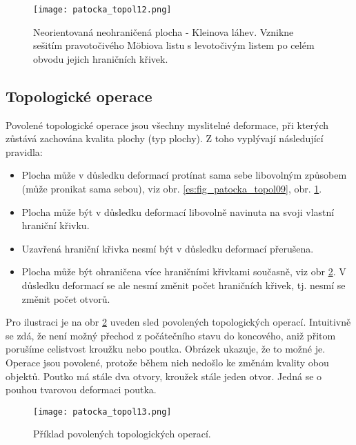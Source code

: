     \begin{figure}[ht!]
      \centering  
      \texttt{[image: patocka\_topol12.png]}
      \caption{Neorientovaná neohraničená plocha - Kleinova láhev. Vznikne sešitím pravotočivého
               Möbiova listu s levotočivým listem po celém obvodu jejich hraničních křivek.
               \cite[s.~54]{Patocka4}} 
      \label{es:fig_patocka_topol12}
    \end{figure}
    
    \subsection{Topologické operace}\label{teo:IchapIIsecIIsubII}
      Povolené topologické operace jsou všechny myslitelné deformace, při kterých zůstává zachována 
      kvalita plochy (typ plochy). Z toho vyplývají následující pravidla:
      \begin{itemize}\addtolength{\itemsep}{-0.5\baselineskip}
        \item Plocha může v důsledku deformací protínat sama sebe libovolným způsobem (může 
              pronikat sama sebou), viz obr. \ref{es:fig_patocka_topol09}, obr. 
              \ref{es:fig_patocka_topol12}.
        \item Plocha může být v důsledku deformací libovolně navinuta na svoji vlastní hraniční  
              křivku.
        \item Uzavřená hraniční křivka nesmí být v důsledku deformací přerušena.
        \item Plocha může být ohraničena více hraničními křivkami současně, viz obr 
              \ref{es:fig_patocka_topol13}. V důsledku deformací se ale nesmí změnit počet 
              hraničních křivek, tj. nesmí se změnit počet otvorů.
     \end{itemize}
      
      Pro ilustraci je na obr \ref{es:fig_patocka_topol13} uveden sled povolených topologických 
      operací. Intuitivně se zdá, že není možný přechod z počátečního stavu do koncového, aniž 
      přitom porušíme celistvost kroužku nebo poutka. Obrázek ukazuje, že to možné je. Operace jsou 
      povolené, protože během nich nedošlo ke změnám kvality obou objektů. Poutko má stále dva 
      otvory, kroužek stále jeden otvor. Jedná se o pouhou tvarovou deformaci poutka.
    
      \begin{figure}[ht!]
        \centering  
        \texttt{[image: patocka\_topol13.png]}
        \caption{Příklad povolených topologických operací.\cite[s.~54]{Patocka4}} 
        \label{es:fig_patocka_topol13}
      \end{figure}
    
